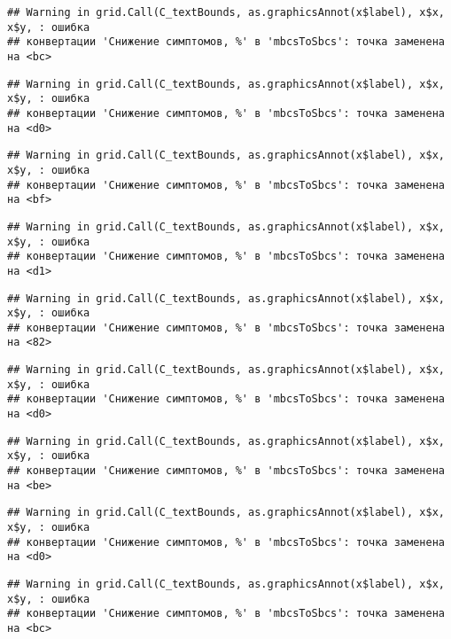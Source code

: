 \documentclass[
]{article}
\begin{document}
\begin{verbatim}
## Warning in grid.Call(C_textBounds, as.graphicsAnnot(x$label), x$x, x$y, : ошибка
## конвертации 'Снижение симптомов, %' в 'mbcsToSbcs': точка заменена на <bc>
\end{verbatim}

\begin{verbatim}
## Warning in grid.Call(C_textBounds, as.graphicsAnnot(x$label), x$x, x$y, : ошибка
## конвертации 'Снижение симптомов, %' в 'mbcsToSbcs': точка заменена на <d0>
\end{verbatim}

\begin{verbatim}
## Warning in grid.Call(C_textBounds, as.graphicsAnnot(x$label), x$x, x$y, : ошибка
## конвертации 'Снижение симптомов, %' в 'mbcsToSbcs': точка заменена на <bf>
\end{verbatim}

\begin{verbatim}
## Warning in grid.Call(C_textBounds, as.graphicsAnnot(x$label), x$x, x$y, : ошибка
## конвертации 'Снижение симптомов, %' в 'mbcsToSbcs': точка заменена на <d1>
\end{verbatim}

\begin{verbatim}
## Warning in grid.Call(C_textBounds, as.graphicsAnnot(x$label), x$x, x$y, : ошибка
## конвертации 'Снижение симптомов, %' в 'mbcsToSbcs': точка заменена на <82>
\end{verbatim}

\begin{verbatim}
## Warning in grid.Call(C_textBounds, as.graphicsAnnot(x$label), x$x, x$y, : ошибка
## конвертации 'Снижение симптомов, %' в 'mbcsToSbcs': точка заменена на <d0>
\end{verbatim}

\begin{verbatim}
## Warning in grid.Call(C_textBounds, as.graphicsAnnot(x$label), x$x, x$y, : ошибка
## конвертации 'Снижение симптомов, %' в 'mbcsToSbcs': точка заменена на <be>
\end{verbatim}

\begin{verbatim}
## Warning in grid.Call(C_textBounds, as.graphicsAnnot(x$label), x$x, x$y, : ошибка
## конвертации 'Снижение симптомов, %' в 'mbcsToSbcs': точка заменена на <d0>
\end{verbatim}

\begin{verbatim}
## Warning in grid.Call(C_textBounds, as.graphicsAnnot(x$label), x$x, x$y, : ошибка
## конвертации 'Снижение симптомов, %' в 'mbcsToSbcs': точка заменена на <bc>
\end{verbatim}
\end{document}
